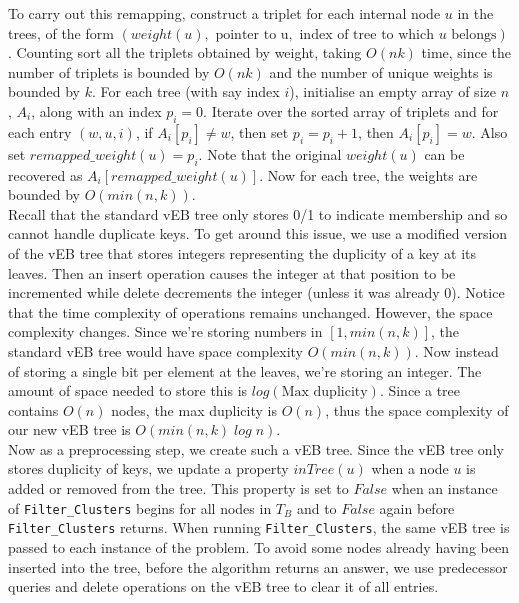 \documentclass[a4paper]{article}
\begin{document}
    To carry out this remapping, construct a triplet for each internal node $u$ in the trees, of the form $(weight(u), \text{ pointer to u}, \text{ index of tree to which }u\text{ belongs})$. Counting sort all the triplets obtained by weight, taking $O(nk)$ time, since the number of triplets is bounded by $O(nk)$ and the number of unique weights is bounded by $k$. For each tree (with say index $i$), initialise an empty array of size $n$, $A_i$, along with an index $p_i = 0$. Iterate over the sorted array of triplets and for each entry $(w, u, i)$, if $A_i[p_i] \neq w$, then set $p_i = p_i + 1$, then $A_i[p_i] = w$. Also set $remapped\_weight(u) = p_i$. Note that the original $weight(u)$ can be recovered as $A_i[remapped\_weight(u)]$. Now for each tree, the weights are bounded by $O(min(n, k))$.\\

    Recall that the standard vEB tree only stores 0/1 to indicate membership and so cannot handle duplicate keys. To get around this issue, we use a modified version of the vEB tree that stores integers representing the duplicity of a key at its leaves. Then an insert operation causes the integer at that position to be incremented while delete decrements the integer (unless it was already $0$). Notice that the time complexity of operations remains unchanged. However, the space complexity changes. Since we're storing numbers in $[1, min(n, k)]$, the standard vEB tree would have space complexity $O(min(n, k))$. Now instead of storing a single bit per element at the leaves, we're storing an integer. The amount of space needed to store this is $log(\text{Max duplicity})$. Since a tree contains $O(n)$ nodes, the max duplicity is $O(n)$, thus the space complexity of our new vEB tree is $O(min(n, k)\;log\;n)$.\\

    Now as a preprocessing step, we create such a vEB tree. Since the vEB tree only stores duplicity of keys, we update a property $inTree(u)$ when a node $u$ is added or removed from the tree. This property is set to $False$ when an instance of \texttt{Filter\_Clusters} begins for all nodes in $T_B$ and to $False$ again before \texttt{Filter\_Clusters} returns. When running \texttt{Filter\_Clusters}, the same vEB tree is passed to each instance of the problem. To avoid some nodes already having been inserted into the tree, before the algorithm returns an answer, we use predecessor queries and delete operations on the vEB tree to clear it of all entries.\\
\end{document}
